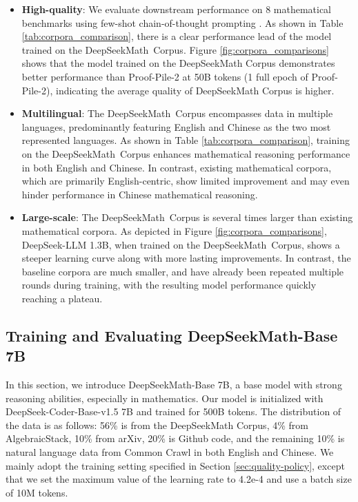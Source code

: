\begin{itemize}[topsep=0pt]
    \item \textbf{High-quality}:
    We evaluate downstream performance on 8 mathematical benchmarks using few-shot chain-of-thought prompting \cite{cot}. As shown in Table \ref{tab:corpora_comparison}, there is a clear performance lead of the model trained on the DeepSeekMath~Corpus. Figure \ref{fig:corpora_comparisons} shows that the model trained on the DeepSeekMath Corpus demonstrates better performance than Proof-Pile-2 at 50B tokens (1 full epoch of Proof-Pile-2), indicating the average quality of DeepSeekMath Corpus is higher. 
    \item \textbf{Multilingual}:
    The DeepSeekMath~Corpus encompasses data in multiple languages, predominantly featuring English and Chinese as the two most represented languages. As shown in Table \ref{tab:corpora_comparison}, training on the DeepSeekMath~Corpus enhances mathematical reasoning performance in both English and Chinese. In contrast, existing mathematical corpora, which are primarily English-centric, show limited improvement and may even hinder performance in Chinese mathematical reasoning.
    \item \textbf{Large-scale}:
    The DeepSeekMath~Corpus is several times larger than existing mathematical corpora. As depicted in Figure \ref{fig:corpora_comparisons}, DeepSeek-LLM 1.3B, when trained on the DeepSeekMath~Corpus, shows a steeper learning curve along with more lasting improvements. In contrast, the baseline corpora are much smaller, and have already been repeated multiple rounds during training, with the resulting model performance quickly reaching a plateau.
\end{itemize}

\subsection{Training and Evaluating DeepSeekMath-Base 7B}

In this section, we introduce DeepSeekMath-Base 7B, a base model with strong reasoning abilities, especially in mathematics. Our model is initialized with DeepSeek-Coder-Base-v1.5 7B \citep{deepseek-coder} and trained for 500B tokens. The distribution of the data  is as follows: 56\% is from the DeepSeekMath Corpus, 4\% from AlgebraicStack, 10\% from arXiv, 20\% is Github code, and the remaining 10\% is natural language data from Common Crawl in both English and Chinese. We mainly adopt the training setting specified in Section \ref{sec:quality-policy}, except that we set the maximum value of the learning rate to 4.2e-4 and use a batch size of 10M tokens.

